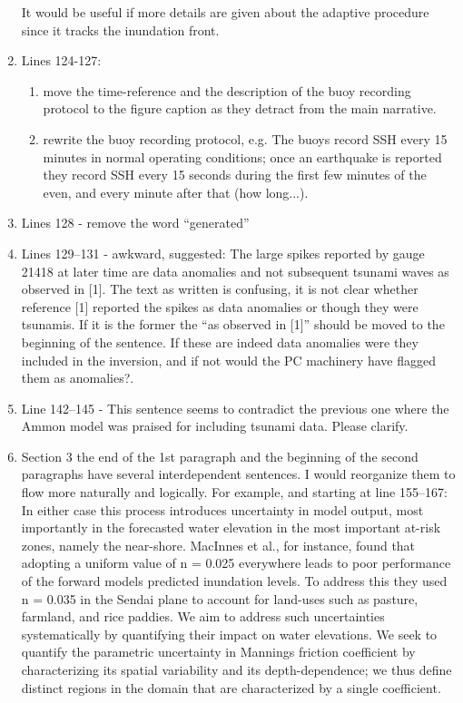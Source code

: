 \documentclass[]{article}
\begin{document}
\begin{enumerate}
\begin{quote}
\end{quote}
It would be useful if more details are given about the adaptive procedure since it tracks the inundation front.

\item Lines 124-127:
\begin{enumerate}
    \item move the time-reference and the description of the buoy recording protocol to the figure caption as they detract from the main narrative.
    \item rewrite the buoy recording protocol, e.g.  The buoys record SSH every 15 minutes in normal operating conditions; once an earthquake is reported they record SSH every 15 seconds during the first few minutes of the even, and every minute after that (how long...).
\end{enumerate}
\item Lines 128 - remove the word ``generated''
\item Lines 129–131 - awkward, suggested:  The large spikes reported by gauge 21418 at later time are data anomalies and not subsequent tsunami waves as observed in [1].  The text as written is confusing, it is not clear whether reference [1] reported the spikes as data anomalies or though they were tsunamis. If it is the former the ``as observed in [1]'' should be moved to the beginning of the sentence.  If these are indeed data anomalies were they included in the inversion, and if not would the PC machinery have flagged them as anomalies?.
\item Line 142–145 - This sentence seems to contradict the previous one where the Ammon model was praised for including tsunami data. Please clarify.
\item Section 3 the end of the 1st paragraph and the beginning of the second paragraphs have several interdependent sentences. I would reorganize them to flow more naturally and logically. For example, and starting at line 155–167:  In either case this process introduces uncertainty in model output, most importantly in the forecasted water elevation in the most important at-risk zones, namely the near-shore. MacInnes et al., for instance, found that adopting a uniform value of n = 0.025 everywhere leads to poor performance of the forward models predicted inundation levels. To address this they used n = 0.035 in the Sendai plane to account for land-uses such as pasture, farmland, and rice paddies. We aim to address such uncertainties systematically by quantifying their impact on water elevations.  We seek to quantify the parametric uncertainty in Mannings friction coefficient by characterizing its spatial variability and its depth-dependence; we thus define distinct regions in the domain that are characterized by a single coefficient.

\end{enumerate}
\end{document}

